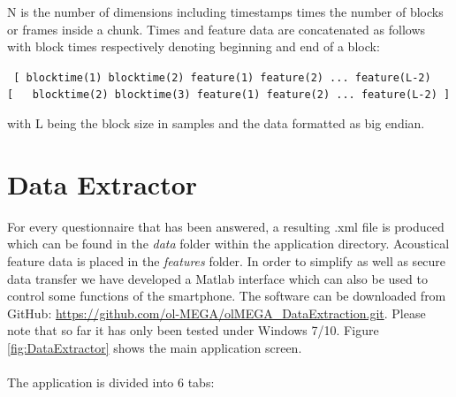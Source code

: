\documentclass[11pt,a4paper,titlepage]{article}
\begin{document}
N is the number of dimensions including timestamps times the number of blocks or frames inside a chunk. Times and feature data are concatenated as follows with block times respectively denoting beginning and end of a block:\\

\begin{tcolorbox}[colback=black!10!white,colframe=black!50!white, boxsep=1pt,left=4pt,right=4pt,top=4pt,bottom=2pt]
	\texttt{
		[ blocktime(1) blocktime(2) feature(1) feature(2) ... feature(L-2)\\
		\color{black!10!white}[\ \ \color{black} blocktime(2) blocktime(3) feature(1) feature(2) ... feature(L-2) ]
	}
\end{tcolorbox}
\vspace{0.5cm}
with L being the block size in samples and the data formatted as big endian.


\clearpage


\section{Data Extractor}\label{sec:transfer}

For every questionnaire that has been answered, a resulting .xml file is produced which can be found in the \textit{data} folder within the application directory. Acoustical feature data is placed in the \textit{features} folder. In order to simplify as well as secure data transfer we have developed a Matlab interface which can also be used to control some functions of the smartphone. The software can be downloaded from GitHub: \url{https://github.com/ol-MEGA/olMEGA_DataExtraction.git}. Please note that so far it has only been tested under Windows 7/10. Figure \ref{fig:DataExtractor} shows the main application screen.\\
\\
The application is divided into 6 tabs:
\end{document}
